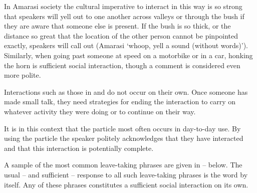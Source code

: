 In Amarasi society the cultural imperative to interact in this way
is so strong that speakers will yell out to one another across
valleys or through the bush if they are aware that someone else is present.
If the bush is so thick, or the distance so great that the location
of the other person cannot be pinpointed exactly,
speakers will call out (Amarasi  `whoop, yell a sound (without words)').
Similarly, when going past someone at speed on a motorbike or in a car,
honking the horn is sufficient social interaction,
though a comment is considered even more polite.

Interactions such as those in 
and  do not occur on their own.
Once someone has made small talk,
they need strategies for ending the interaction 
to carry on whatever activity they were doing
or to continue on their way.

It is in this context that the particle 
most often occurs in day-to-day use.
By using the particle  the speaker
politely acknowledges that they have interacted
and that this interaction is potentially complete.

A sample of the most common leave-taking phrases
are given in -- below.
The usual -- and sufficient -- response to all such 
leave-taking phrases is the word  by itself.
Any of these phrases constitutes a sufficient social interaction on its own.

\begin{multicols}{2}
	\begin{exe}
		\label{ex:au 'koon goen tua}
		\label{ex:au 'fain jeen tua}
	\end{exe}
\end{multicols}

